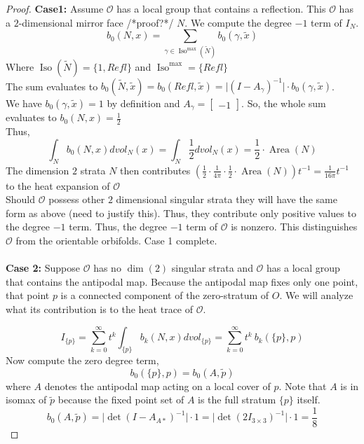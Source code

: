 \documentclass[12pt]{article}
\newcommand{\myabs}[1]{\vert#1\vert}
\theoremstyle{definition}
\DeclareMathOperator{\iso}{Iso}
\DeclareMathOperator{\area}{Area}
\begin{document}
\begin{proof}
\textbf{Case1:}
Assume $\mathcal{O}$ has a local group that contains a reflection. This $\mathcal{O}$ has a $2$-dimensional mirror face /*proof?*/ $N$. We compute the degree $-1$ term of $I_N$. 
\begin{equation*}
    b_0(N,x)=\sum_{\gamma \in \iso^{\max}(\tilde{N})} b_0(\gamma,\tilde{x})
\end{equation*}
Where $\iso(\tilde{N}) = \{ 1, Refl \}$ and $\iso^{\max} = \{Refl\}$\\
The sum evaluates to
$b_0(\tilde{N},\tilde{x}) = b_0(Refl,\tilde{x}) = \vert (I-A_{\gamma})^{-1} \vert \cdot b_0(\gamma,\tilde{x})$.\\
We have $b_0(\gamma,\tilde{x}) = 1$ by definition and $A_{\gamma} = \begin{bmatrix} -1 \end{bmatrix}$. So, the whole sum evaluates to $b_0(N,x) = \frac{1}{2}$ \\
Thus,
\begin{equation*}
    \int_{N}b_0(N,x)dvol_N(x) = \int_{N}\frac{1}{2}dvol_N(x) = \frac{1}{2}\cdot \area(N)
\end{equation*}
The dimension $2$ strata $N$ then contributes $(\frac{1}{2} \cdot \frac{1}{4\pi} \cdot \frac{1}{2} \cdot \area(N))t^{-1} = \frac{1}{16\pi}t^{-1}$ to the heat expansion of $\mathcal{O}$\\
Should $\mathcal{O}$ possess other $2$ dimensional singular strata they will have the same form as above (need to justify this). Thus, they contribute only positive values to the degree $-1$ term.
Thus, the degree $-1$ term of $\mathcal{O}$ is nonzero. This distinguishes $\mathcal{O}$ from the orientable orbifolds. Case 1 complete.\\\\
\textbf{Case 2:}
Suppose $\mathcal{O}$ has no $\dim(2)$ singular strata and $\mathcal{O}$ has a local group that contains the antipodal map.  Because the antipodal map fixes only one point, that point $p$ is a connected component of the zero-stratum of $O$.  We will analyze what its contribution is to the heat trace of $\mathcal{O}$.

 \begin{equation*}
    I_{\{p\}} = \sum_{k=0}^{\infty}t^k\int_{\{p\}}b_k(N,x)dvol_{\{p\}} =\sum_{k=0}^{\infty}t^k \ b_k(\{p\},p)
    \end{equation*}
 Now compute the zero degree term,
 \[b_0(\{p\},p) = b_0(A,\tilde{p})\]
where $A$ denotes the antipodal map acting on a local cover of $p$.  Note that $A$ is in isomax of $\tilde{p}$ because the fixed point set of $A$ is the full stratum $\{p\}$ itself.
\[b_0(A,\tilde{p}) = \myabs{\det(I-A_{A*})^{-1}} \cdot 1 =  \myabs{\det(2I_{3 \times 3})^{-1}} \cdot 1 = \frac{1}{8}\]


\end{proof}
\end{document}
